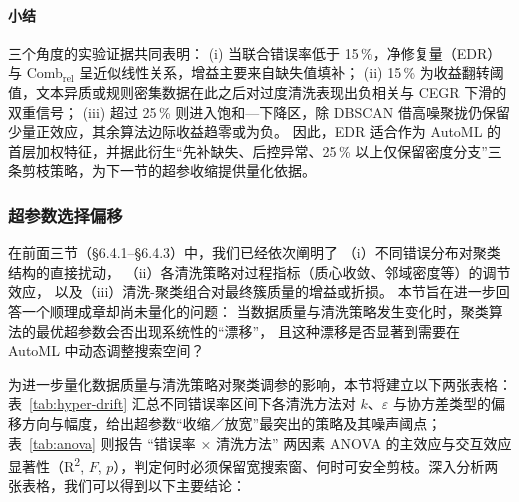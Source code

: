 \documentclass[10pt]{article} %
\numberwithin{equation}{section}
\begin{document}
\paragraph{小结}\;  
\textcolor[rgb]{0.00,0.07,1.00}{三个角度的实验证据共同表明：  
(i)  当联合错误率低于 15\,\%，净修复量（EDR）与 Comb\(_{\text{rel}}\) 呈近似线性关系，增益主要来自缺失值填补；  
(ii)  15\,\% 为收益翻转阈值，文本异质或规则密集数据在此之后对过度清洗表现出负相关与 CEGR 下滑的双重信号；  
(iii)  超过 25\,\% 则进入饱和—下降区，除 DBSCAN 借高噪聚拢仍保留少量正效应，其余算法边际收益趋零或为负。  
因此，EDR 适合作为 AutoML 的首层加权特征，并据此衍生“先补缺失、后控异常、25\,\% 以上仅保留密度分支”三条剪枝策略，为下一节的超参收缩提供量化依据。}


\subsubsection{超参数选择偏移}
\label{subsec:param_shift}

在前面三节（§6.4.1–§6.4.3）中，我们已经依次阐明了
（i）不同错误分布对聚类结构的直接扰动，
（ii）各清洗策略对过程指标（质心收敛、邻域密度等）的调节效应，
以及（iii）清洗-聚类组合对最终簇质量的增益或折损。
本节旨在进一步回答一个顺理成章却尚未量化的问题：  
\textcolor[rgb]{0.00,0.07,1.00}{当数据质量与清洗策略发生变化时，聚类算法的最优超参数会否出现系统性的“漂移”，
且这种漂移是否显著到需要在 AutoML 中动态调整搜索空间？}

为进一步量化数据质量与清洗策略对聚类调参的影响，本节将建立以下两张表格：表~\ref{tab:hyper-drift} 汇总不同错误率区间下各清洗方法对 $k$、$\varepsilon$ 与协方差类型的偏移方向与幅度，给出超参数“收缩／放宽”最突出的策略及其噪声阈点；表~\ref{tab:anova} 则报告 “错误率 × 清洗方法” 两因素 ANOVA 的主效应与交互效应显著性（R\textsuperscript{2}, $F$, $p$），判定何时必须保留宽搜索窗、何时可安全剪枝。深入分析两张表格，我们可以得到以下主要结论：


\newcommand{\sigfilled}{\ding{72}}   %
\newcommand{\sighollow}{\ding{73}}   %
\end{document}
